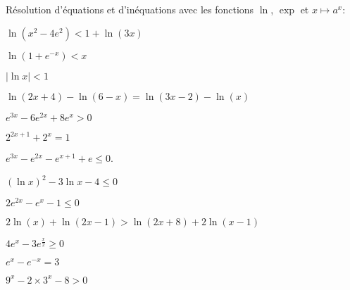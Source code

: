 \documentclass[a4paper, 11pt]{article}
\begin{document}




\begin{exercice}\;
R\'esolution d'\'equations et d'in\'equations avec les fonctions $\ln{}$, $\exp{}$ et $x\mapsto a^x$:
\begin{enumerate}
\begin{minipage}[t]{0.55\textwidth}
\item  $\ln{(x^2-4e^2)}<1+\ln{(3x)}$
\item  $\ln{(1+e^{-x})}<x$
\item $|\ln{x}|<1$
\item  $\ln{(2x+4)} -\ln{(6-x)}=\ln{(3x-2)}-\ln{(x)}  $
\item  $e^{3x}-6e^{2x}+8e^x>0$
\item $2^{2x+1}+2^x=1$
\item $e^{3x}-e^{2x}-e^{x+1}+e\leq 0$.
\item  $(\ln{x})^2-3\ln{x}-4\leq 0$
\end{minipage}
\begin{minipage}[t]{0.35\textwidth}
\item  $2e^{2x}-e^x-1\leq 0$
\item  $2\ln{(x)}+\ln{(2x-1)}>\ln{(2x+8)}+2\ln{(x-1)}$
\item  $4e^x-3e^{\frac{x}{2}}\geq 0$
\item  $e^x-e^{-x}=3$
\item $9^x-2\times 3^x-8>0$
\end{minipage}
\end{enumerate}
\end{exercice}
\end{document}
